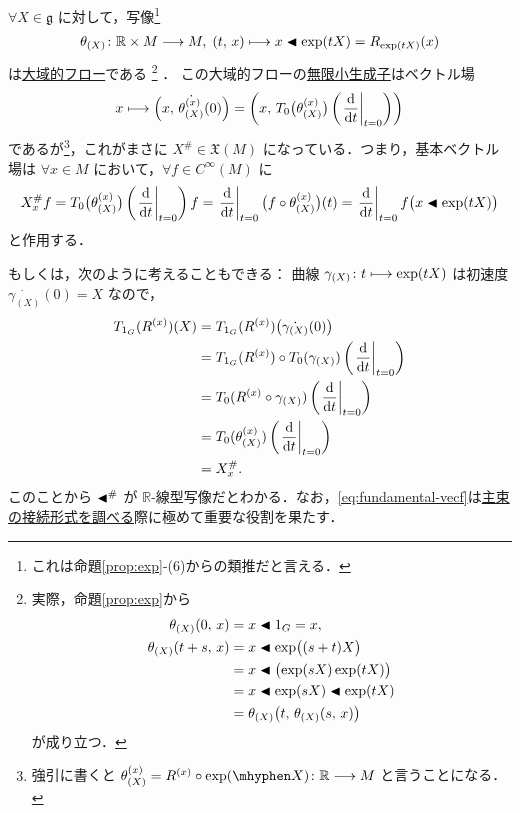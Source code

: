 \documentclass[TQFT_main]{subfiles}
\begin{document}
$\forall X \in \mathfrak{g}$ に対して，\cinfty 写像\footnote{これは命題\ref{prop:exp}-(6)からの類推だと言える．}
\begin{align}
    \theta_{(X)} \colon \mathbb{R} \times M \longrightarrow M,\; (t,\, x) \longmapsto x \blacktriangleleft \exp(tX) = R_{\exp(tX)} (x)
\end{align}
は\hyperref[def:flow-global]{大域的フロー}である
\footnote{
    実際，命題\ref{prop:exp}から
    \begin{align}
        \theta_{(X)}(0,\, x) &= x \blacktriangleleft 1_G = x, \\
        \theta_{(X)}(t+s,\, x) &= x \blacktriangleleft \exp \bigl( (s+t) X \bigr) \\
        &= x \blacktriangleleft \bigl(\exp(sX)\exp(tX)\bigr) \\
        &= x \blacktriangleleft \exp(sX) \blacktriangleleft \exp(tX) \\
        &= \theta_{(X)} \bigl(t ,\, \theta_{(X)}(s,\, x)\bigr)
    \end{align}
    が成り立つ．
}
．
この大域的フローの\hyperref[def:thm:fundamental-flow]{無限小生成子}はベクトル場
\begin{align}
    x \lmto \Bigl( x,\, \dot{\theta_{(X)}^{(x)}} (0) \Bigr) = \left( x,\, T_0 \bigl( \theta_{(X)}^{(x)} \bigr) \left( \eval{\dv{}{t}}_{t=0} \right)   \right) 
\end{align}
であるが\footnote{強引に書くと $\theta^{(x)}_{(X)} = R^{(x)} \circ \exp (\mhyphen X) \colon \mathbb{R} \lto M$ と言うことになる．}，これがまさに $X^\# \in \mathfrak{X}(M)$ になっている．つまり，基本ベクトル場は $\forall x \in M$ において，$\forall f \in C^\infty (M)$ に
\begin{align}
    X^\#_x f = T_0 \bigl( \theta_{(X)}^{(x)} \bigr) \left( \eval{\dv{}{t}}_{t=0} \right)f = \eval{\dv{}{t}}_{t=0} \bigl( f \circ \theta_{(X)}^{(x)}  \bigr) (t) = \eval{\dv{}{t}}_{t=0} f \bigl(x \btl \exp(tX)\bigr)
\end{align}
と作用する．

もしくは，次のように考えることもできる：
曲線 $\gamma_{(X)} \colon t  \longmapsto \exp(tX)$ は初速度 $\dot{\gamma_{(X)}}(0) = X$ なので，
\begin{align}
    T_{1_G}(R^{(x)}) (X) 
    &= T_{1_G} (R^{(x)}) \bigl( \dot{\gamma_{(X)}}(0) \bigr) \\
    &= T_{1_G} (R^{(x)}) \circ T_0 (\gamma_{(X)}) \left( \eval{\dv{}{t}}_{t=0} \right) \\
    &= T_0 (R^{(x)} \circ \gamma_{(X)}) \left( \eval{\dv{}{t}}_{t=0} \right) \\
    &= T_0 (\theta_{(X)}^{(x)})\left( \eval{\dv{}{t}}_{t=0} \right) \\
    &= X^\#_x. \label{eq:fundamental-vecf}
\end{align}
このことから $\blacktriangleleft^\#$ が $\mathbb{R}$-線型写像だとわかる．なお，\eqref{eq:fundamental-vecf}は\hyperref[thm:connection-basic]{主束の接続形式を調べる}際に極めて重要な役割を果たす．
\end{document}

